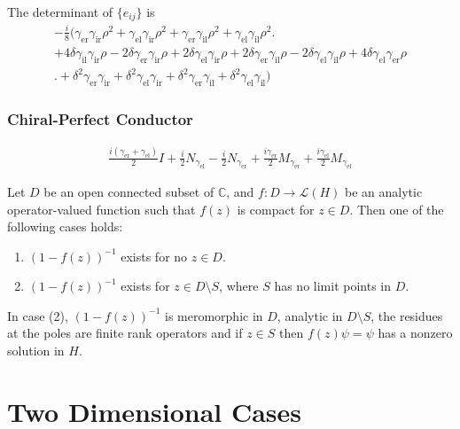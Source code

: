 The determinant of $\{e_{ij}\}$ is
\begin{multline*}
  -\frac{i}{8}\bigl(\gamma_\text{er} \gamma_\text{ir} \rho^2+\gamma_\text{el} \gamma_\text{ir} \rho^2+\gamma_\text{er} \gamma_\text{il} \rho^2+\gamma_\text{el} \gamma_\text{il} \rho^2 \bigr.\\
  +4 \delta \gamma_\text{il} \gamma_\text{ir} \rho-2 \delta \gamma_\text{er} \gamma_\text{ir} \rho+2 \delta \gamma_\text{el} \gamma_\text{ir} \rho+2 \delta \gamma_\text{er} \gamma_\text{il} \rho-2 \delta \gamma_\text{el} \gamma_\text{il} \rho+4 \delta \gamma_\text{el} \gamma_\text{er} \rho \\
  \bigl.+\delta^2 \gamma_\text{er} \gamma_\text{ir}+\delta^2 \gamma_\text{el} \gamma_\text{ir}+\delta^2 \gamma_\text{er} \gamma_\text{il}+\delta^2 \gamma_\text{el} \gamma_\text{il}\bigr)
\end{multline*}

\subsubsection{Chiral-Perfect Conductor}
\begin{align*}
  \frac{i(\gamma_\text{er}+\gamma_\text{el})}{2} I + \frac{i}{2} N_{\gamma_\text{el}} - \frac{i}{2} N_{\gamma_\text{er}} + \frac{i\gamma_\text{er}}{2} M_{\gamma_\text{er}} + \frac{i\gamma_\text{el}}{2} M_{\gamma_\text{el}}
\end{align*}

\begin{thm} %
  Let $D$ be an open connected subset of $\mathbb{C}$, and $f:D\to\mathcal{L}(H)$ be an analytic operator-valued function such that $f(z)$ is compact for $z\in D$. Then one of the following cases holds:
  \begin{enumerate}
    \item $(1-f(z))^{-1}$ exists for no $z\in D$.
    \item $(1-f(z))^{-1}$ exists for $z\in D\setminus S$, where $S$ has no limit points in $D$.
  \end{enumerate}
  In case (2), $(1-f(z))^{-1}$ is meromorphic in $D$, analytic in $D\setminus S$, the residues at the poles are finite rank operators and if $z\in S$ then $f(z)\psi=\psi$ has a nonzero solution in $H$.
\end{thm}


\section{Two Dimensional Cases}

